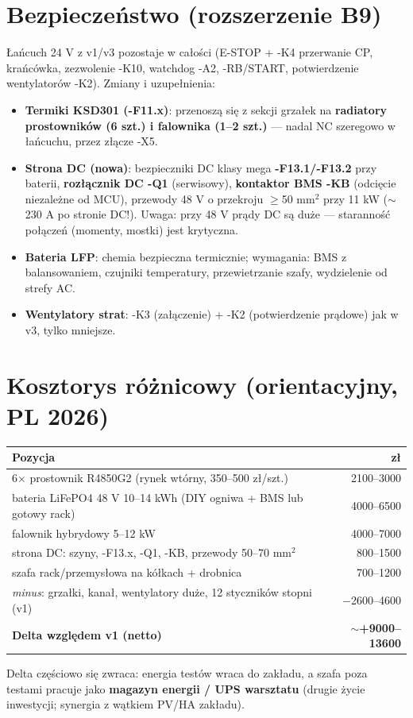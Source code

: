 \documentclass[11pt,a4paper]{article}
\begin{document}
\section{Bezpieczeństwo (rozszerzenie B9)}
Łańcuch 24 V z v1/v3 pozostaje w całości (E-STOP + -K4 przerwanie CP, krańcówka, zezwolenie -K10,
watchdog -A2, -RB/START, potwierdzenie wentylatorów -K2). Zmiany i uzupełnienia:
\begin{itemize}
\item \textbf{Termiki KSD301 (-F11.x)}: przenoszą się z sekcji grzałek na \textbf{radiatory prostowników
(6 szt.) i falownika (1--2 szt.)} --- nadal NC szeregowo w łańcuchu, przez złącze -X5.
\item \textbf{Strona DC (nowa)}: bezpieczniki DC klasy mega \textbf{-F13.1/-F13.2} przy baterii,
\textbf{rozłącznik DC -Q1} (serwisowy), \textbf{kontaktor BMS -KB} (odcięcie niezależne od MCU),
przewody 48 V o przekroju $\ge$50 mm$^2$ przy 11 kW ($\sim$230 A po stronie DC!). Uwaga: przy 48 V prądy DC
są duże --- staranność połączeń (momenty, mostki) jest krytyczna.
\item \textbf{Bateria LFP}: chemia bezpieczna termicznie; wymagania: BMS z balansowaniem, czujniki temperatury,
przewietrzanie szafy, wydzielenie od strefy AC.
\item \textbf{Wentylatory strat}: -K3 (załączenie) + -K2 (potwierdzenie prądowe) jak w v3, tylko mniejsze.
\end{itemize}

\section{Kosztorys różnicowy (orientacyjny, PL 2026)}
\begin{longtable}{@{}p{}r@{}}
\toprule
\textbf{Pozycja} & \textbf{zł}\\
\midrule
6$\times$ prostownik R4850G2 (rynek wtórny, 350--500 zł/szt.) & 2100--3000\\
bateria LiFePO4 48 V 10--14 kWh (DIY ogniwa + BMS lub gotowy rack) & 4000--6500\\
falownik hybrydowy 5--12 kW & 4000--7000\\
strona DC: szyny, -F13.x, -Q1, -KB, przewody 50--70 mm$^2$ & 800--1500\\
szafa rack/przemysłowa na kółkach + drobnica & 700--1200\\
\emph{minus}: grzałki, kanał, wentylatory duże, 12 styczników stopni (v1) & $-$2600--4600\\
\midrule
\textbf{Delta względem v1 (netto)} & \textbf{$\sim$+9000--13600}\\
\bottomrule
\end{longtable}
Delta częściowo się zwraca: energia testów wraca do zakładu, a szafa poza testami pracuje jako
\textbf{magazyn energii / UPS warsztatu} (drugie życie inwestycji; synergia z wątkiem PV/HA zakładu).
\end{document}
